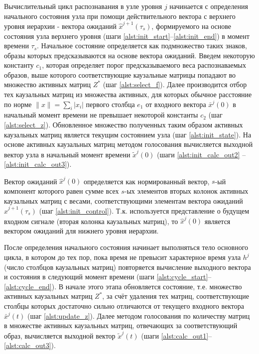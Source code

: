 \documentclass[12pt]{scrartcl}
\begin{document}
	Вычислительный цикл распознавания в узле уровня $j$ начинается с определения начального состояния узла при помощи действительного вектора с верхнего уровня иерархии - вектора ожиданий $\hat x^{j+1}(\tau_s)$, формируемого на основе состояния узла верхнего уровня (шаги \ref{alst:init_start}--\ref{alst:init_end}) в момент времени $\tau_s$. Начальное состояние определяется как подмножество таких знаков, образы которых предсказываются на основе вектора ожиданий. Введем некоторую константу $c_1$, которая определяет порог предсказываемого веса распознаваемых образов, выше которого соответствующие каузальные матрицы попадают во множество активных матриц $Z^*$ (шаг \ref{alst:select_f}). Далее производится отбор тех каузальных матриц из множества активных, для которых обычное расстояние по норме $\|x\|=\sum_i |x_i|$ первого столбца $e_1$ от входного вектора $\bar x^j(0)$ в начальный момент времени не превышает некоторой константы $c_2$ (шаг \ref{alst:select_z}). Обновленное множество полученных таким образом активных каузальных матриц является текущим состоянием узла (шаг \ref{alst:init_state}). На основе активных каузальных матриц методом голосования вычисляется выходной вектор узла  в начальный момент времени $\tilde x^j(0)$ (шаги \ref{alst:init_calc_out2} -- \ref{alst:init_calc_out3}).

	Вектор ожиданий $\hat x^j(0)$ определяется как нормированный вектор, $s$-ый компонент которого равен сумме всех $s$-ых элементов вторых колонок активных каузальных матриц с весами, соответствующими элементам вектора ожиданий $\hat x^{j+1}(\tau_s)$ (шаг \ref{alst:init_control}). Т.к. используется представление о будущем входном сигнале (вторая колонка каузальных матриц), то $\hat x^j(0)$ является вектором ожиданий для нижнего уровня иерархии.

	\linespread{1}
	\begin{algorithm}[H]
		\begin{algorithmic}[1]
			
		\end{algorithmic}
	\end{algorithm}
	\linespread{2}
		
	После определения начального состояния начинает выполняться тело основного цикла, в котором до тех пор, пока время не превысит характерное время узла $h^j$ (число столбцов каузальных матриц) повторяется вычисление выходного вектора и состояния в следующий момент времени (шаги \ref{alst:cycle_start}--\ref{alst:cycle_end}). В начале этого этапа обновляется состояние, т.е. множество активных каузальных матриц $Z^*$, за счёт удаления тех матриц, соответствующие столбцы которых достаточно сильно отличаются от текущего входного вектора $\bar x^j(t)$ (шаг \ref{alst:update_z}). Далее методом голосования по количеству матриц в множестве активных каузальных матриц, отвечающих за соответствующий образ, вычисляется выходной вектор $\tilde x^j(t)$ (шаги \ref{alst:calc_out1}--\ref{alst:calc_out3}).
\end{document}
